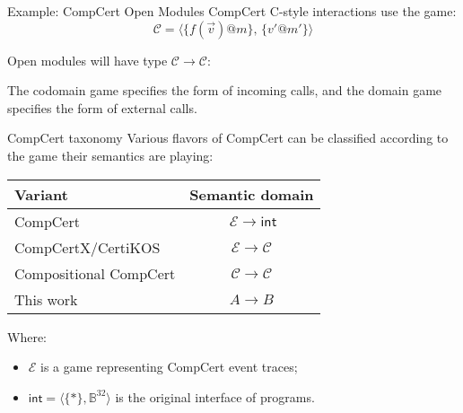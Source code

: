 \documentclass{beamer}
\newcommand{\kw}[1]{\ensuremath{ \mathsf{#1} }}
\begin{document}
\begin{frame}{Example: CompCert Open Modules}
CompCert C-style interactions
use the game:
\[ \mathcal{C} = \langle \{ f(\vec{v})@m \}, \, \{ v'@m' \} \rangle \]

Open modules will have type $\mathcal{C} \rightarrow \mathcal{C}$:
\begin{center}
\end{center}

The codomain game specifies the form of incoming calls,
and the domain game specifies the form of external calls.
\end{frame}

\begin{frame}{CompCert taxonomy} %
Various flavors of CompCert can be classified according to
the game their semantics are playing:
\begin{center}
  \begin{tabular}{lc}
    \hline
    Variant & Semantic domain \\
    \hline
    CompCert  & $\ \mathcal{E} \rightarrow \kw{int}$ \\
    CompCertX/CertiKOS & $\mathcal{E} \rightarrow \mathcal{C}$ \\
    Compositional CompCert & $\mathcal{C} \rightarrow \mathcal{C}$ \\
    This work & $A \rightarrow B$ \\
    \hline
  \end{tabular}
\end{center}

\vspace{1ex}
Where:
\begin{itemize}
\item $\mathcal{E}$ is a game representing CompCert event traces;
\item $\kw{int} = \langle \{*\}, \mathbb{B}^{32} \rangle$
  is the original interface of programs.
\end{itemize}
\end{frame}
\end{document}
